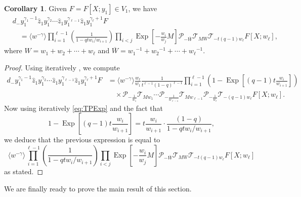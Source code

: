 \documentclass[reqno]{amsart}
\theoremstyle{plain}
\theoremstyle{definition}
\newtheorem{corollary}[theorem]{Corollary}
\theoremstyle{remark}
\DeclareMathOperator{\Exp}{Exp}
\newcommand{\z}{\widehat{z}}
\newcommand{\<}{\langle}
\renewcommand{\>}{\rangle}
\begin{document}
\begin{corollary}
    \label{cor:Dgamma1plethystic}
    Given $F = F[X;y_1]\in V_1$, we have
    \begin{align*}
        & d_- y_1^{\gamma_{1}-1} \z_1 y_1^{\gamma_{2}} \cdots \z_1 y_1^{\gamma_{\ell-1}} \z_1 y_1^{\gamma_{\ell}+1} F \\
        & \quad = \langle w^{-\gamma} \rangle \prod_{i=1}^{\ell-1}\left(\frac{1}{1-qtw_{i}/w_{i+1}}\right) \prod_{i<j} \Exp\left[-\frac{w_{i}}{w_j} M\right] \mathcal{P}_{-\overline{W}} \mathcal{T}_{MW} \mathcal{T}_{-t(q-1)w_\ell}F[X;w_\ell],
    \end{align*}
    where $ W = w_1+w_2+\cdots +w_{\ell}$ and $\overline{W} = {w_1}^{-1}+{w_2}^{-1}+\cdots +{w_\ell}^{-1}$.
\end{corollary}

\begin{proof}
    Using iteratively , we compute
    \begin{align*}
        d_- y_1^{\gamma_{1}-1} \z_1 y_1^{\gamma_{2}} \cdots \z_1 y_1^{\gamma_{\ell-1}} \z_1 y_1^{\gamma_{\ell}+1} F & = \langle w^{-\gamma} \rangle \frac{w_\ell}{w_1} \frac{1}{t^{\ell-1}(1-q)^{\ell-1}}\prod_{i=1}^{\ell-1} \left(1-\Exp\left[(q-1)t \frac{w_{i}}{w_{i+1}} \right] \right)
        \\
        & \quad \times
        \mathcal{P}_{-\frac{1}{w_1}} \mathcal{T}_{Mw_1} \cdots \mathcal{P}_{-\frac{1}{w_{\ell-1}}} \mathcal{T}_{Mw_{\ell-1}}\mathcal{P}_{-\frac{1}{w_\ell}} \mathcal{T}_{-(q-1)w_\ell}F[X;w_\ell].
    \end{align*}
    Now using iteratively \eqref{eq:TPExp} and the fact that
    \[1-\Exp\left[(q-1)t\frac{w_i}{w_{i+1}}\right]=t\frac{w_i}{w_{i+1}}\cdot \frac{(1-q)}{1-qtw_i/w_{i+1}}, \]
    we deduce that the previous expression is equal to
    \[
        \langle w^{-\gamma} \rangle \prod_{i=1}^{\ell-1}\left(\frac{1}{1-qtw_{i}/w_{i+1}}\right) \prod_{i<j} \Exp\left[-\frac{w_{i}}{w_j} M\right] \mathcal{P}_{-\overline{W}} \mathcal{T}_{MW} \mathcal{T}_{-t(q-1)w_\ell} F[X;w_\ell]
    \]
    as stated.
\end{proof}

We are finally ready to prove the main result of this section.
\end{document}
